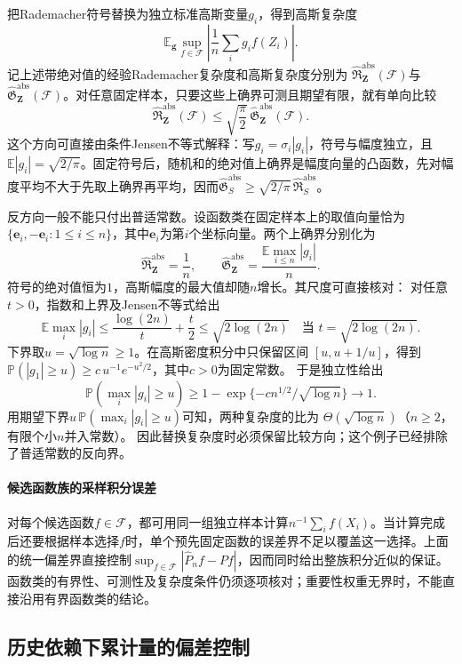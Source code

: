 把Rademacher符号替换为独立标准高斯变量\(g_i\)，得到高斯复杂度
\[ \mathbb{E}_{\bm{g}}
  \sup_{f\in\mathcal{F}}
  \left|\frac{1}{n}\sum_i g_i f(Z_i)\right|. \]
记上述带绝对值的经验Rademacher复杂度和高斯复杂度分别为
\(\widehat{\mathfrak{R}}_{\bm{Z}}^{\mathrm{abs}}(\mathcal{F})\)与
\(\widehat{\mathfrak{G}}_{\bm{Z}}^{\mathrm{abs}}(\mathcal{F})\)。对任意固定样本，只要这些上确界可测且期望有限，就有单向比较
\[
  \widehat{\mathfrak{R}}_{\bm{Z}}^{\mathrm{abs}}(\mathcal{F})
  \leq
  \sqrt{\frac{\pi}{2}}\,
  \widehat{\mathfrak{G}}_{\bm{Z}}^{\mathrm{abs}}(\mathcal{F}).
\]
这个方向可直接由条件Jensen不等式解释：写\(g_i=\sigma_i|g_i|\)，符号与幅度独立，且\(\mathbb E|g_i|=\sqrt{2/\pi}\)。固定符号后，随机和的绝对值上确界是幅度向量的凸函数，先对幅度平均不大于先取上确界再平均，因而\(\widehat{\mathfrak G}^{\mathrm{abs}}_S\geq\sqrt{2/\pi}\,\widehat{\mathfrak R}^{\mathrm{abs}}_S\)。

反方向一般不能只付出普适常数。设函数类在固定样本上的取值向量恰为
\(\{\bm e_i,-\bm e_i:1\leq i\leq n\}\)，其中\(\bm e_i\)为第\(i\)个坐标向量。两个上确界分别化为
\[
 \widehat{\mathfrak R}^{\mathrm{abs}}_{\bm Z}=\frac1n,\qquad
 \widehat{\mathfrak G}^{\mathrm{abs}}_{\bm Z}
   =\frac{\mathbb E\max_{i\leq n}|g_i|}{n}.
\]
符号的绝对值恒为\(1\)，高斯幅度的最大值却随\(n\)增长。其尺度可直接核对：
对任意\(t>0\)，指数和上界及Jensen不等式给出
\[
 \mathbb E\max_i|g_i|
 \leq\frac{\log(2n)}t+\frac t2
 \leq\sqrt{2\log(2n)}
 \quad\text{当 }t=\sqrt{2\log(2n)}.
\]
下界取\(u=\sqrt{\log n}\geq1\)。在高斯密度积分中只保留区间
\([u,u+1/u]\)，得到
\(\mathbb P(|g_1|\geq u)\geq c\,u^{-1}e^{-u^2/2}\)，其中\(c>0\)为固定常数。
于是独立性给出
\[
 \mathbb P(\max_i|g_i|\geq u)
 \geq1-\exp\{-cn^{1/2}/\sqrt{\log n}\}\longrightarrow1.
\]
用期望下界\(u\,\mathbb P(\max_i|g_i|\geq u)\)可知，两种复杂度的比为
\(\Theta(\sqrt{\log n})\)（\(n\geq2\)，有限个小\(n\)并入常数）。
因此替换复杂度时必须保留比较方向；这个例子已经排除了普适常数的反向界。

\paragraph{候选函数族的采样积分误差}
对每个候选函数\(f\in\mathcal F\)，都可用同一组独立样本计算\(n^{-1}\sum_i f(X_i)\)。当计算完成后还要根据样本选择\(f\)时，单个预先固定函数的误差界不足以覆盖这一选择。上面的统一偏差界直接控制\(\sup_{f\in\mathcal F}|\widehat P_n f-Pf|\)，因而同时给出整族积分近似的保证。函数类的有界性、可测性及复杂度条件仍须逐项核对；重要性权重无界时，不能直接沿用有界函数类的结论。

\subsection{历史依赖下累计量的偏差控制}

